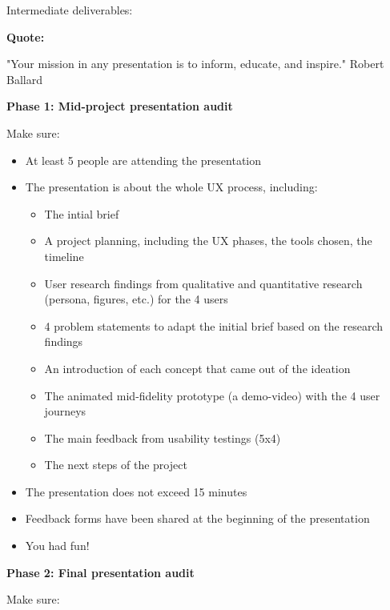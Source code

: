 Intermediate deliverables:

\textbf{Quote:}

"Your mission in any presentation is to inform, educate, and inspire." Robert Ballard

\medskip

\textbf{Phase 1: Mid-project presentation audit}

Make sure:

\begin{itemize}
\item At least 5 people are attending the presentation
\item The presentation is about the whole UX process, including:
\begin{itemize}
\item The intial brief
\item A project planning, including the UX phases, the tools chosen, the timeline
\item User research findings from qualitative and quantitative research (persona, figures, etc.) for the 4 users
\item 4 problem statements to adapt the initial brief based on the research findings
\item An introduction of each concept that came out of the ideation
\item The animated mid-fidelity prototype (a demo-video) with the 4 user journeys
\item The main feedback from usability testings (5x4)
\item The next steps of the project
\end{itemize}
\item The presentation does not exceed 15 minutes
\item Feedback forms have been shared at the beginning of the presentation
\item You had fun!
\end{itemize}

\medskip

\textbf{Phase 2: Final presentation audit}

Make sure:

